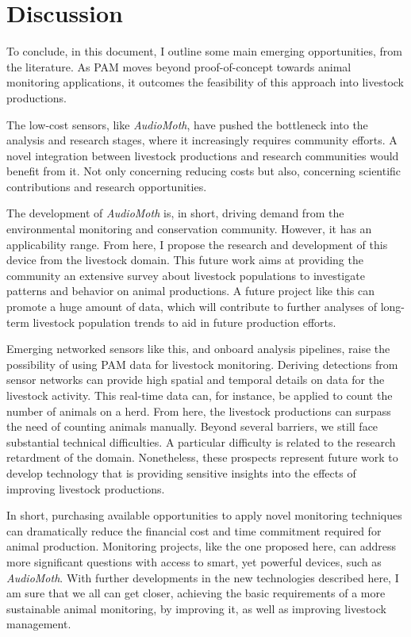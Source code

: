 \section{Discussion}
\label{sec:sec003}

To conclude, in this document, I outline some main emerging opportunities, from the literature.
As PAM moves beyond proof-of-concept towards animal monitoring applications, it outcomes the feasibility of this approach into livestock productions.

The low-cost sensors, like \textit{AudioMoth}, have pushed the bottleneck into the analysis and research stages, where it increasingly requires community efforts.
A novel integration between livestock productions and research communities would benefit from it.
Not only concerning reducing costs but also, concerning scientific contributions and research opportunities.

The development of \textit{AudioMoth} is, in short, driving demand from the environmental monitoring and conservation community.
However, it has an applicability range.
From here, I propose the research and development of this device from the livestock domain.
This future work aims at providing the community an extensive survey about livestock populations to investigate patterns and behavior on animal productions.
A future project like this can promote a huge amount of data, which will contribute to further analyses of long-term livestock population trends to aid in future production efforts.

Emerging networked sensors like this, and onboard analysis pipelines, raise the possibility of using PAM data for livestock monitoring.
Deriving detections from sensor networks can provide high spatial and temporal details on data for the livestock activity.
This real-time data can, for instance, be applied to count the number of animals on a herd.
From here, the livestock productions can surpass the need of counting animals manually.
Beyond several barriers, we still face substantial technical difficulties.
A particular difficulty is related to the research retardment of the domain.
Nonetheless, these prospects represent future work to develop technology that is providing sensitive insights into the effects of improving livestock productions.

In short, purchasing available opportunities to apply novel monitoring techniques can dramatically reduce the financial cost and time commitment required for animal production.
Monitoring projects, like the one proposed here, can address more significant questions with access to smart, yet powerful devices, such as \textit{AudioMoth}.
With further developments in the new technologies described here, I am sure that we all can get closer, achieving the basic requirements of a more sustainable animal monitoring, by improving it, as well as improving livestock management.